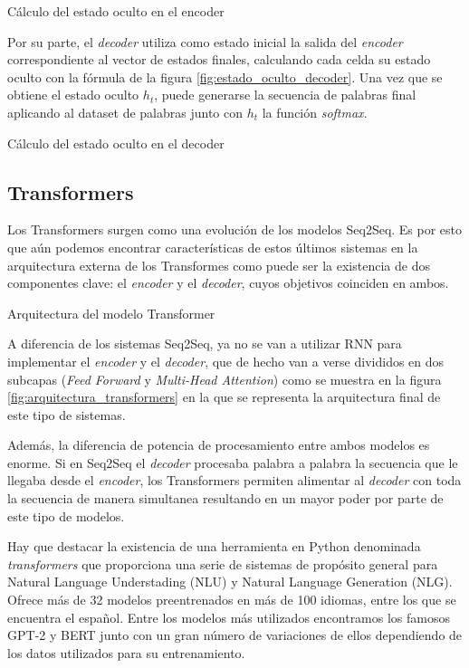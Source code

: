 %
{Cálculo del estado oculto en el encoder}

Por su parte, el \textit{decoder} utiliza como estado inicial la salida del \textit{encoder} correspondiente al vector de estados finales, calculando cada celda su estado oculto con la fórmula de la figura \ref{fig:estado_oculto_decoder}. Una vez que se obtiene el estado oculto $h_{t}$, puede generarse la secuencia de palabras final aplicando al dataset de palabras junto con $h_{t}$ la función \textit{softmax}.

%
{Cálculo del estado oculto en el decoder}

\subsection{Transformers} 
Los Transformers surgen como una evolución de los modelos Seq2Seq. Es por esto que aún podemos encontrar características de estos últimos sistemas en la arquitectura externa de los Transformes como puede ser la existencia de dos componentes clave: el \textit{encoder} y el \textit{decoder}, cuyos objetivos coinciden en ambos.

%
{Arquitectura del modelo Transformer}

A diferencia de los sistemas Seq2Seq, ya no se van a utilizar RNN para implementar el \textit{encoder} y el \textit{decoder}, que de hecho van a verse divididos en dos subcapas (\textit{Feed Forward} y \textit{Multi-Head Attention}) como se muestra en la figura \ref{fig:arquitectura_transformers} en la que se representa la arquitectura final de este tipo de sistemas.

Además, la diferencia de potencia de procesamiento entre ambos modelos es enorme. Si en Seq2Seq el \textit{decoder} procesaba palabra a palabra la secuencia que le llegaba desde el \textit{encoder}, los Transformers permiten alimentar al \textit{decoder} con toda la secuencia de manera simultanea resultando en un mayor poder por parte de este tipo de modelos.



Hay que destacar la existencia de una herramienta en Python denominada \textit{transformers} que proporciona una serie de sistemas de propósito general para Natural Language Understading (NLU) y Natural Language Generation (NLG). Ofrece más de 32 modelos preentrenados en más de 100 idiomas, entre los que se encuentra el español. Entre los modelos más utilizados encontramos los famosos GPT-2 y BERT junto con un gran número de variaciones de ellos dependiendo de los datos utilizados para su entrenamiento.

